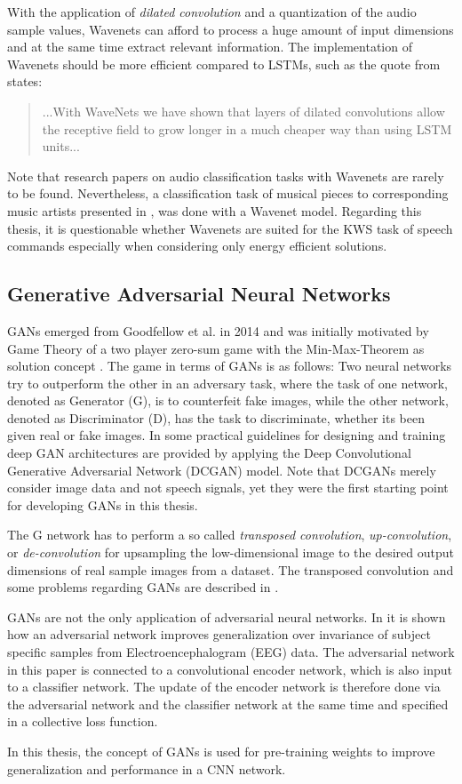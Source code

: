 With the application of \emph{dilated convolution} and a quantization of the audio sample values, Wavenets can afford to process a huge amount of input dimensions and at the same time extract relevant information.
The implementation of Wavenets should be more efficient compared to LSTMs, such as the quote from \cite{Oord2016} states:
\begin{quote}
  ...With WaveNets we have shown that layers of dilated convolutions allow the receptive field to grow longer in a much cheaper way than using LSTM units...
\end{quote}
Note that research papers on audio classification tasks with Wavenets are rarely to be found.
Nevertheless, a classification task of musical pieces to corresponding music artists presented in \cite{Zhang2020}, was done with a Wavenet model.
Regarding this thesis, it is questionable whether Wavenets are suited for the KWS task of speech commands especially when considering only energy efficient solutions.



\subsection{Generative Adversarial Neural Networks}\label{sec:prev_nn_adv}
GANs emerged from Goodfellow et al. in 2014 \cite{Goodfellow2014} and was initially motivated by Game Theory of a two player zero-sum game with the Min-Max-Theorem as solution concept \cite{VonNeumann1944}.
The game in terms of GANs is as follows: Two neural networks try to outperform the other in an adversary task, where the task of one network, denoted as Generator (G), is to counterfeit fake images, while the other network, denoted as Discriminator (D), has the task to discriminate, whether its been given real or fake images.
In \cite{Radford2016} some practical guidelines for designing and training deep GAN architectures are provided by applying the Deep Convolutional Generative Adversarial Network (DCGAN) model.
Note that DCGANs merely consider image data and not speech signals, yet they were the first starting point for developing GANs in this thesis.

The G network has to perform a so called \emph{transposed convolution}, \emph{up-convolution}, or \emph{de-convolution} for upsampling the low-dimensional image to the desired output dimensions of real sample images from a dataset.
The transposed convolution and some problems regarding GANs are described in \cite{Durall2020}.

GANs are not the only application of adversarial neural networks. 
In \cite{Oezdenizci2020} it is shown how an adversarial network improves generalization over invariance of subject specific samples from Electroencephalogram (EEG) data.
The adversarial network in this paper is connected to a convolutional encoder network, which is also input to a classifier network.
The update of the encoder network is therefore done via the adversarial network and the classifier network at the same time and specified in a collective loss function.

In this thesis, the concept of GANs is used for pre-training weights to improve generalization and performance in a CNN network.
